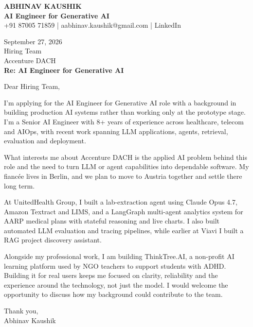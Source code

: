 \documentclass[10pt,a4paper]{article}
\begin{document}
\begin{center}
{\Large\bfseries ABHINAV KAUSHIK}\\[2pt]
{\bfseries AI Engineer for Generative AI}\\[2pt]
+91 87005 71859 \quad | \quad aabhinav.kaushik@gmail.com \quad | \quad LinkedIn
\end{center}
\vspace{8pt}
September 27, 2026\\[6pt]
Hiring Team\\
Accenture DACH\\[4pt]
\textbf{Re: AI Engineer for Generative AI}

Dear Hiring Team,

I’m applying for the AI Engineer for Generative AI role with a background in building production AI systems rather than working only at the prototype stage. I’m a Senior AI Engineer with 8+ years of experience across healthcare, telecom and AIOps, with recent work spanning LLM applications, agents, retrieval, evaluation and deployment.

What interests me about Accenture DACH is the applied AI problem behind this role and the need to turn LLM or agent capabilities into dependable software. My fiancée lives in Berlin, and we plan to move to Austria together and settle there long term.

At UnitedHealth Group, I built a lab-extraction agent using Claude Opus 4.7, Amazon Textract and LIMS, and a LangGraph multi-agent analytics system for AARP medical plans with stateful reasoning and live charts. I also built automated LLM evaluation and tracing pipelines, while earlier at Viavi I built a RAG project discovery assistant.

Alongside my professional work, I am building ThinkTree.AI, a non-profit AI learning platform used by NGO teachers to support students with ADHD. Building it for real users keeps me focused on clarity, reliability and the experience around the technology, not just the model. I would welcome the opportunity to discuss how my background could contribute to the team.

Thank you,\\
Abhinav Kaushik
\end{document}
